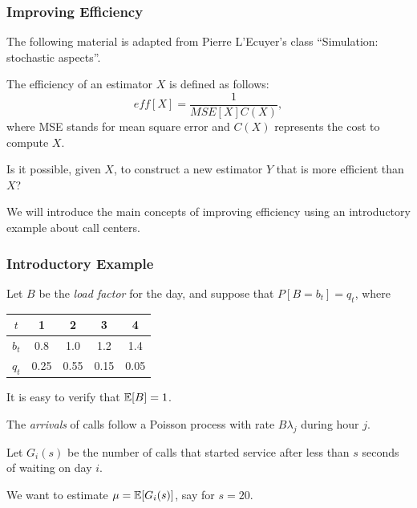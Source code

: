 \documentclass[t,usepdftitle=false,aspectratio=169]{beamer}
\begin{document}
\begin{frame}
	\frametitle{Improving Efficiency}
	
	The following material is adapted from Pierre L'Ecuyer's class ``Simulation: stochastic aspects''.
	
	\mbox{}
	
	The efficiency of an estimator \(X\) is defined as follows:
	$$
	eff[X] = \frac{1}{MSE[X] C(X)},
	$$
	where MSE stands for mean square error and \(C(X)\) represents the cost to compute \(X\).
	
	\mbox{}
	
	Is it possible, given \(X\), to construct a new estimator \(Y\) that is more efficient than \(X\)?
	
	\mbox{}
	
	We will introduce the main concepts of improving efficiency using an introductory example about call centers.
	
\end{frame}

\begin{frame}
	\frametitle{Introductory Example}
	
	Let \(B\) be the \emph{load factor} for the day, and suppose that \(P[B = b_t] = q_t\), where
	\begin{center}
		\begin{tabular}{c|cccc}
			${t}$   &   1  &  2   &   3  &  4  \\  
			\hline
			${b_t}$ &  0.8 &  1.0 &  1.2 &  1.4 \\
			${q_t}$ & 0.25 & 0.55 & 0.15 & 0.05 \\
		\end{tabular}
	\end{center}
	
	\mbox{}
	
	It is easy to verify that \({\mathbb{E}}[B] = 1\). %
	
	\mbox{}
	
	The \emph{arrivals} of calls follow a Poisson process with rate
	\(B{\lambda_j}\) during hour \(j\).
	
	\mbox{}
	
	Let \(G_i(s)\) be the number of calls that started service
	after less than \(s\) seconds of waiting on day \(i\).
	
	\mbox{}
	
	We want to estimate \(\mu = {\mathbb{E}}[G_i(s)]\), say for \(s=20\).
	
\end{frame}
\end{document}
